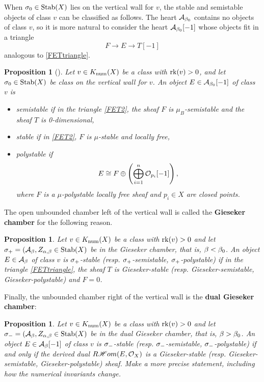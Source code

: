 \documentclass[letterpaper,12pt]{amsart}
\newtheorem{prop}[thm]{Proposition}
\theoremstyle{remark}
\begin{document}
When $\sigma_0 \in \operatorname{\mathrm{Stab}}(X)$ lies on the vertical wall for $v$, the stable and semistable objects of class $v$ can be classified as follows. The heart $\mathcal{A}_{\beta_0}$ contains no objects of class $v$, so it is more natural to consider the heart $\mathcal{A}_{\beta_0}[-1]$ whose objects fit in a triangle
\begin{equation}\label{FET2}
    F \to E \to T[-1]
\end{equation}
analogous to \eqref{FETtriangle}.
\begin{prop}[{\cite[Proposition 2.2]{t}}]
    Let $v \in K_{\mathrm{num}}(X)$ be a class with $\operatorname{\mathrm{rk}}(v) > 0$, and let $\sigma_0 \in \operatorname{\mathrm{Stab}}(X)$ be class on the vertical wall for $v$. An object $E \in \mathcal{A}_{\beta_0}[-1]$ of class $v$ is
    \begin{itemize}
        \item \textit{semistable} if in the triangle \eqref{FET2}, the sheaf $F$ is $\mu_B$-semistable and the sheaf $T$ is 0-dimensional,
        \item \textit{stable} if in \eqref{FET2}, $F$ is $\mu$-stable and locally free,
        \item \textit{polystable} if
        \[ E \cong F \oplus \left(\bigoplus_{i=1}^n \mathcal{O}_{p_i}[-1] \right), \]
        where $F$ is a $\mu$-polystable locally free sheaf and $p_i \in X$ are closed points.
    \end{itemize}
\end{prop}
The open unbounded chamber left of the vertical wall is called the \textbf{Gieseker chamber} for the following reason.
\begin{prop}
    Let $v \in K_{\mathrm{num}}(X)$ be a class with $\operatorname{\mathrm{rk}}(v) > 0$ and let $\sigma_+ = (\mathcal{A}_\beta, Z_{\alpha,\beta} \in \operatorname{\mathrm{Stab}}(X)$ be in the Gieseker chamber, that is, $\beta < \beta_0$. An object $E \in \mathcal{A}_\beta$ of class $v$ is $\sigma_+$-stable (resp. $\sigma_+$-semistable, $\sigma_+$-polystable) if in the triangle \eqref{FETtriangle}, the sheaf $T$ is Gieseker-stable (resp. Gieseker-semistable, Gieseker-polystable) and $F = 0$.
\end{prop}
Finally, the unbounded chamber right of the vertical wall is the \textbf{dual Gieseker chamber}:
\begin{prop}
    Let $v \in K_{\mathrm{num}}(X)$ be a class with $\operatorname{\mathrm{rk}}(v) > 0$ and let $\sigma_- = (\mathcal{A}_\beta, Z_{\alpha,\beta} \in \operatorname{\mathrm{Stab}}(X)$ be in the dual Gieseker chamber, that is, $\beta > \beta_0$. An object $E \in \mathcal{A}_\beta[-1]$ of class $v$ is $\sigma_-$-stable (resp. $\sigma_-$-semistable, $\sigma_-$-polystable) if and only if the derived dual $R\mathscr{H}om(E, \mathcal{O}_X)$ is a Gieseker-stable (resp. Gieseker-semistable, Gieseker-polystable) sheaf. {\color{red} Make a more precise statement, including how the numerical invariants change.}
\end{prop}
\end{document}
